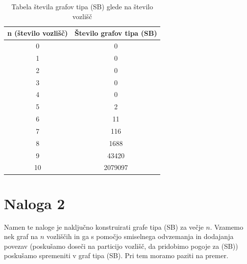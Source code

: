 \documentclass{article}
\begin{document}
 \begin{table}[h!]
    \centering
    \begin{tabular}{|c|c|}
    \hline
    \textbf{n (število vozlišč)} & \textbf{Število grafov tipa (SB)} \\
    \hline
    0 & 0 \\
    1 & 0 \\
    2 & 0 \\
    3 & 0 \\
    4 & 0 \\
    5 & 2 \\
    6 & 11 \\
    7 & 116\\
    8 & 1688\\
    9 & 43420 \\
    10 & 2079097 \\
    \hline
    \end{tabular}
    \caption{Tabela števila grafov tipa (SB) glede na število vozlišč}
    \end{table}

\section{Naloga 2}

Namen te naloge je naključno konstruirati grafe tipa (SB) za večje $n$.
Vzamemo nek graf na $n$ vozliščih in ga s pomočjo smiselnega odvzemanja in dodajanja povezav 
(poskušamo doseči na particijo vozlišč, da pridobimo pogoje za (SB)) poskušamo 
spremeniti v graf tipa (SB). Pri tem moramo paziti na premer.
\end{document}
